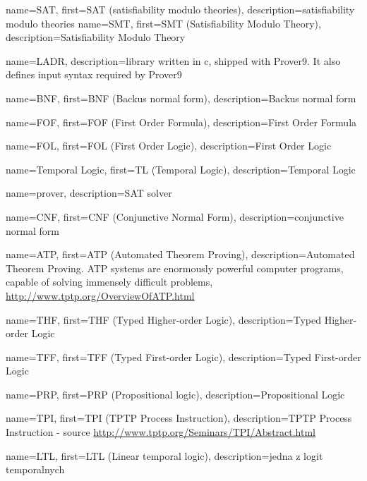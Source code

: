 
 {
    name=SAT,
    first={SAT (satisfiability modulo theories)},
    description={satisfiability modulo theories}
}
 {
    name=SMT,
    first={SMT (Satisfiability Modulo Theory)},
    description={Satisfiability Modulo Theory}
}

 {
    name=LADR,
    description={library written in c, shipped with Prover9. It also defines input syntax required by Prover9}
}

 {
    name=BNF,
    first={BNF (Backus normal form)},
    description={Backus normal form}
}

 {
    name=FOF,
    first={FOF (First Order Formula)},
    description={First Order Formula}
}

 {
    name=FOL,
    first={FOL (First Order Logic)},
    description={First Order Logic}
}

 {
    name={Temporal Logic},
    first={TL (Temporal Logic)},
    description={Temporal Logic}
}

 {
    name=prover,
    description={SAT solver}
}

 {
    name=CNF,
    first={CNF (Conjunctive Normal Form)},
    description={conjunctive normal form}
}

 {
    name=ATP,
    first={ATP (Automated Theorem Proving)},
    description={Automated Theorem Proving. ATP systems are enormously powerful computer programs, capable of solving immensely difficult problems, \url{http://www.tptp.org/OverviewOfATP.html}}
}

 {
    name=THF,
    first={THF (Typed Higher-order Logic)},
    description={Typed Higher-order Logic}
}

 {
    name=TFF,
    first={TFF (Typed First-order Logic)},
    description={Typed First-order Logic}
}

 {
    name={PRP},
    first={PRP (Propositional logic)},
    description={Propositional Logic}
}

 {
    name=TPI,
    first={TPI (TPTP Process Instruction)},
    description={TPTP Process Instruction - source \url{http://www.tptp.org/Seminars/TPI/Abstract.html}}
}

 {
    name=LTL,
    first={LTL (Linear temporal logic)},
    description={jedna z logit temporalnych}
}


